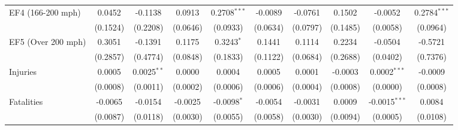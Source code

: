 \documentclass[letterpaper]{article}
\begin{document}
\begin{table}[H]
{\begin{tabular}{lccccccccc}
   EF4 (166-200 mph)       & 0.0452                            & -0.1138                          & 0.0913                             & 0.2708$^{***}$                     & -0.0089                      & -0.0761                          & 0.1502                      & -0.0052                    & 0.2784$^{***}$\\   
                        & (0.1524)                          & (0.2208)                         & (0.0646)                           & (0.0933)                           & (0.0634)                     & (0.0797)                         & (0.1485)                    & (0.0058)                   & (0.0964)\\   
   EF5 (Over 200 mph)      & 0.3051                            & -0.1391                          & 0.1175                             & 0.3243$^{*}$                       & 0.1441                       & 0.1114                           & 0.2234                      & -0.0504                    & -0.5721\\   
                        & (0.2857)                          & (0.4774)                         & (0.0848)                           & (0.1833)                           & (0.1122)                     & (0.0684)                         & (0.2688)                    & (0.0402)                   & (0.7376)\\   
   Injuries                  & 0.0005                            & 0.0025$^{**}$                    & 0.0000               & 0.0004                             & 0.0005                       & 0.0001                           & -0.0003                     & 0.0002$^{***}$             & -0.0009\\   
                        & (0.0008)                          & (0.0011)                         & (0.0002)                           & (0.0006)                           & (0.0006)                     & (0.0004)                         & (0.0008)                    & (0.0000)     & (0.0008)\\   
   Fatalities                  & -0.0065                           & -0.0154                          & -0.0025                            & -0.0098$^{*}$                      & -0.0054                      & -0.0031                          & 0.0009                      & -0.0015$^{***}$            & 0.0084\\   
                        & (0.0087)                          & (0.0118)                         & (0.0030)                           & (0.0055)                           & (0.0058)                     & (0.0030)                         & (0.0094)                    & (0.0005)                   & (0.0108)\\   

\end{tabular}}
\end{table}
\end{document}
